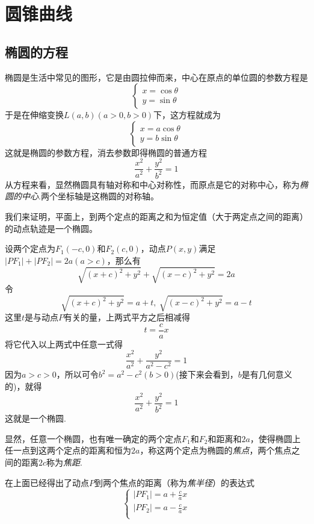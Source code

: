 
\section{圆锥曲线}
\label{sec:conic-section}

\subsection{椭圆的方程}
\label{sec:ellipse-equation}

椭圆是生活中常见的图形，它是由圆拉伸而来，中心在原点的单位圆的参数方程是
\[
  \begin{cases}
    x = \cos{\theta} \\
    y = \sin{\theta}
  \end{cases}
\]
于是在伸缩变换$L(a,b)(a>0,b>0)$下，这方程就成为
\[
  \begin{cases}
    x = a \cos{\theta} \\
    y = b \sin{\theta}
  \end{cases}
\]
这就是椭圆的参数方程，消去参数即得椭圆的普通方程
\[ \frac{x^2}{a^2} + \frac{y^2}{b^2} = 1 \]
从方程来看，显然椭圆具有轴对称和中心对称性，而原点是它的对称中心，称为\emph{椭圆的中心}.两个坐标轴是这椭圆的对称轴。

\begin{example}
  我们来证明，平面上，到两个定点的距离之和为恒定值（大于两定点之间的距离）的动点轨迹是一个椭圆。

  设两个定点为$F_1(-c,0)$和$F_2(c,0)$，动点$P(x,y)$满足$|PF_1|+|PF_2|=2a(a>c)$，那么有
  \[ \sqrt{(x+c)^2+y^2} + \sqrt{(x-c)^2+y^2} = 2a \]
  令
  \[ \sqrt{(x+c)^2+y^2} = a + t, \  \sqrt{(x-c)^2+y^2} = a - t \]
  这里$t$是与动点$P$有关的量，上两式平方之后相减得
  \[ t = \frac{c}{a}x \]
  将它代入以上两式中任意一式得
  \[ \frac{x^2}{a^2} + \frac{y^2}{a^2-c^2} = 1 \]
  因为$a>c>0$，所以可令$b^2=a^2-c^2(b>0)$(接下来会看到，$b$是有几何意义的)，就得
  \[ \frac{x^2}{a^2} + \frac{y^2}{b^2} = 1 \]
  这就是一个椭圆.
\end{example}

  显然，任意一个椭圆，也有唯一确定的两个定点$F_1$和$F_2$和距离和$2a$，使得椭圆上任一点到这两个定点的距离和恒为$2a$，称这两个定点为椭圆的\emph{焦点}，两个焦点之间的距离$2c$称为\emph{焦距}.

  在上面已经得出了动点$P$到两个焦点的距离（称为\emph{焦半径}）的表达式
  \[
  \begin{cases}
    |PF_1| = a + \frac{c}{a} x \\
    |PF_2| = a - \frac{c}{a} x \\
  \end{cases}
  \]

